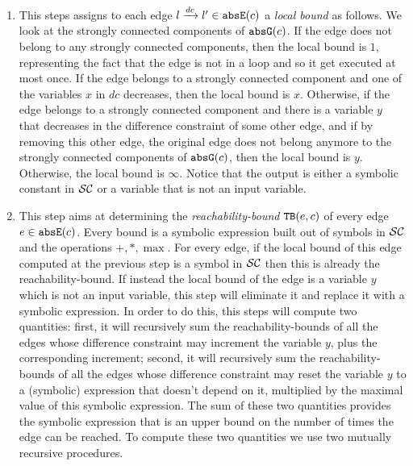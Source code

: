 \begin{enumerate}
\item This steps assigns to each edge  $l \xrightarrow{dc} l'\in \mathtt{abs}{\mathtt{E}}(c)$ a \emph{local bound} as follows. We look at the strongly connected components of $\mathtt{abs}{\mathtt{G}}(c)$. If the edge does not belong to any strongly connected components, then the local bound is $1$, representing the fact that the edge is not in a loop and so it get executed at most once. If the edge belongs to a strongly connected component and one of the variables $x$ in $dc$ decreases, then the local bound is $x$. Otherwise, if the edge belongs to a strongly connected component and there is a variable $y$ that decreases in the difference constraint of some other edge, and if by removing this other edge, the original edge does not belong anymore to the strongly connected components of $\mathtt{abs}{\mathtt{G}}(c)$, then the local bound is $y$. Otherwise, the local bound is $\infty$. Notice that the output is either a symbolic constant in $\mathcal{SC}$ or a variable that is not an input variable.
\item This step aims at determining the \emph{reachability-bound} ${\mathtt{TB}}(e, c)$ of every edge $e \in \mathtt{abs}{\mathtt{E}}(c)$. Every bound is a symbolic expression  built out of symbols in $\mathcal{SC}$ and the operations $+, *, \max$. For every edge, if the local bound of this edge computed at the previous step is a symbol in $\mathcal{SC}$ then this is already the reachability-bound. If instead the local bound of the edge is a variable $y$ which is not an input variable, this step will eliminate it and replace it with a symbolic expression. In order to do this, this steps will compute two quantities: first, it will recursively sum the reachability-bounds of all the edges whose difference constraint may increment the variable $y$, plus the corresponding increment; second, it will recursively sum the reachability-bounds of all the edges whose difference constraint may reset the variable $y$ to a (symbolic) expression that doesn't depend on it, multiplied by the maximal value of this symbolic expression. The sum of these two quantities provides the symbolic expression that is an upper bound on the number of times the edge can be reached. To compute these two quantities we use two mutually recursive procedures.
\end{enumerate}
